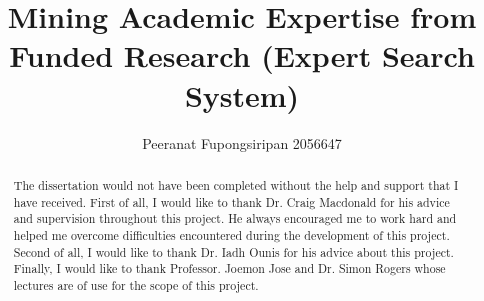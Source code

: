 \documentclass{l4proj}
\title{Mining Academic Expertise from Funded Research (Expert Search System)}
\author{Peeranat Fupongsiripan 2056647}
\begin{document}
\maketitle

\begin{abstract}

\end{abstract}


\renewcommand{\abstractname}{Acknowledgements}
\begin{abstract}
The dissertation would not have been completed without the help and support that I have received.
First of all, I would like to thank Dr. Craig Macdonald for his advice and supervision throughout this project. He always encouraged me to 
work hard and helped me overcome difficulties encountered during the development of this project. Second of all, I would like to thank 
Dr. Iadh Ounis for his advice about this project. Finally, I would like to thank Professor. Joemon Jose and Dr. Simon Rogers whose lectures are 
of use for the scope of this project.
\end{abstract}

\tableofcontents



















\clearpage


\end{document}

